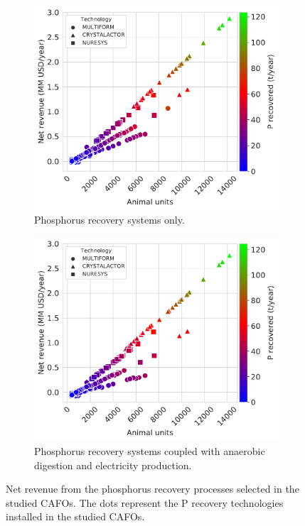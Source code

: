 \documentclass[authoryear]{elsarticle}
\begin{document}
\begin{figure}[H]
	\begin{subfigure}[t]{0.48\linewidth}
		\includegraphics[width=\linewidth]{NetRev_TechSelected_Pcredits22_REC0.pdf} 
		\caption{Phosphorus recovery systems only.}
		\label{fig:NetRev_TechSelected_Pcredits22_REC0}
	\end{subfigure}
	\quad
	\begin{subfigure}[t]{0.48\linewidth}
		\includegraphics[width=\linewidth]{NetRev_TechSelected_Pcredits22_REC60.pdf}
		\caption{Phosphorus recovery systems coupled with anaerobic digestion and electricity production.}
		\label{fig:NetRev_TechSelected_Pcredits22_REC60}
	\end{subfigure}
	
	\caption{Net revenue from the phosphorus recovery processes selected in the studied CAFOs. The dots represent the P recovery technologies installed in the studied CAFOs.}
	\label{fig:NetRev_TechSelected}
\end{figure}
\end{document}
